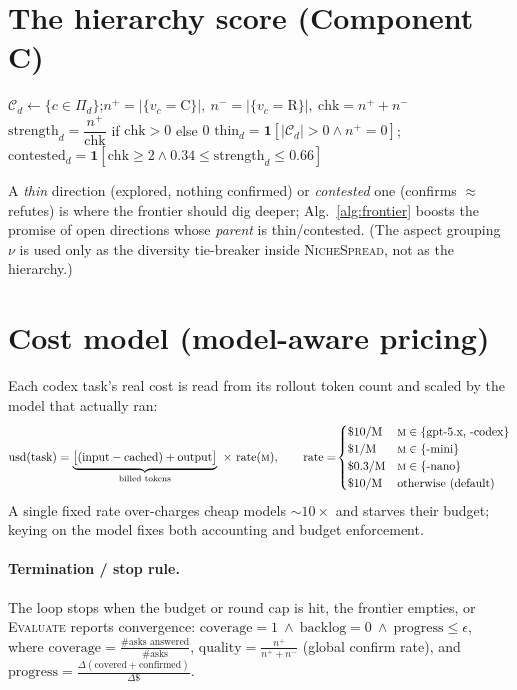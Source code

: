 \documentclass[11pt]{article}
\newcommand{\Dirs}{\mathcal{D}}
\newcommand{\niche}{\nu}
\newcommand{\indic}[1]{\mathbf{1}\!\left[#1\right]}
\begin{document}
\section{The hierarchy score (Component C)}

\begin{algorithm}[H]
\caption{\textsc{DirectionScores} — the two-level belief hierarchy (direction $\to$ its claims)}\label{alg:dirscore}
\begin{algorithmic}[1]
\ForAll{$d\in\Dirs$}
   \State $\mathcal{C}_d\gets\{c\in\Pi_d\}$;\quad $n^{+}\!=\!|\{v_c{=}\mathrm{C}\}|,\ n^{-}\!=\!|\{v_c{=}\mathrm{R}\}|,\ \mathrm{chk}=n^{+}+n^{-}$
   \State $\mathrm{strength}_d=\dfrac{n^{+}}{\mathrm{chk}}$ if $\mathrm{chk}>0$ else $0$
   \State $\mathrm{thin}_d=\indic{|\mathcal{C}_d|>0\wedge n^{+}{=}0}$;\quad $\mathrm{contested}_d=\indic{\mathrm{chk}\ge2\wedge 0.34\le\mathrm{strength}_d\le0.66}$
\EndFor
\end{algorithmic}
\end{algorithm}

\noindent A \emph{thin} direction (explored, nothing confirmed) or \emph{contested} one (confirms
$\approx$ refutes) is where the frontier should dig deeper; Alg.~\ref{alg:frontier} boosts the promise of
open directions whose \emph{parent} is thin/contested. (The aspect grouping $\niche$ is used only as the
diversity tie-breaker inside \textsc{NicheSpread}, not as the hierarchy.)

\section{Cost model (model-aware pricing)}

Each codex task's real cost is read from its rollout token count and scaled by the model that actually ran:
\[
\mathrm{usd}(\text{task})=\underbrace{\big[(\text{input}-\text{cached})+\text{output}\big]}_{\text{billed tokens}}\ \times\ \mathrm{rate}(\textsc{m}),
\qquad
\mathrm{rate}=\!\begin{cases}
\$10/\mathrm{M} & \textsc{m}\in\{\text{gpt-5.x, -codex}\}\\
\$1/\mathrm{M} & \textsc{m}\in\{\text{-mini}\}\\
\$0.3/\mathrm{M} & \textsc{m}\in\{\text{-nano}\}\\
\$10/\mathrm{M} & \text{otherwise (default)}
\end{cases}
\]
A single fixed rate over-charges cheap models $\sim\!10\times$ and starves their budget; keying on the model
fixes both accounting and budget enforcement.

\paragraph{Termination / stop rule.} The loop stops when the budget or round cap is hit, the frontier
empties, or \textsc{Evaluate} reports convergence: $\mathrm{coverage}{=}1\ \wedge\ \mathrm{backlog}{=}0\
\wedge\ \mathrm{progress}\le\epsilon$, where
$\mathrm{coverage}=\tfrac{\#\text{asks answered}}{\#\text{asks}}$,
$\mathrm{quality}=\tfrac{n^{+}}{n^{+}+n^{-}}$ (global confirm rate), and
$\mathrm{progress}=\tfrac{\Delta(\text{covered}+\text{confirmed})}{\Delta\$}$.
\end{document}
